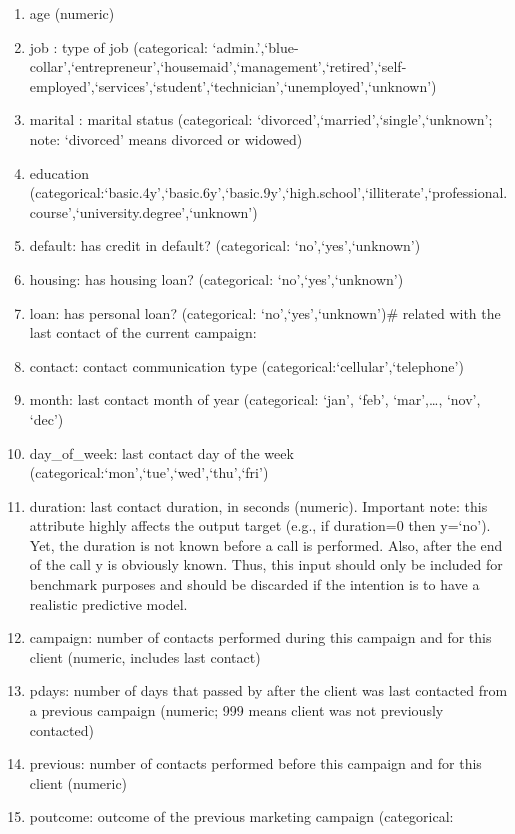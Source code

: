 \documentclass[]{article}
\providecommand{\tightlist}{%
  \setlength{\itemsep}{0pt}\setlength{\parskip}{0pt}}
\begin{document}
\begin{enumerate}
\def\labelenumi{\arabic{enumi}.}
\tightlist
\item
  age (numeric)
\item
  job : type of job (categorical:
  `admin.',`blue-collar',`entrepreneur',`housemaid',`management',`retired',`self-employed',`services',`student',`technician',`unemployed',`unknown')
\item
  marital : marital status (categorical:
  `divorced',`married',`single',`unknown'; note: `divorced' means
  divorced or widowed)
\item
  education
  (categorical:`basic.4y',`basic.6y',`basic.9y',`high.school',`illiterate',`professional.course',`university.degree',`unknown')
\item
  default: has credit in default? (categorical: `no',`yes',`unknown')
\item
  housing: has housing loan? (categorical: `no',`yes',`unknown')
\item
  loan: has personal loan? (categorical: `no',`yes',`unknown')\# related
  with the last contact of the current campaign:
\item
  contact: contact communication type
  (categorical:`cellular',`telephone')
\item
  month: last contact month of year (categorical: `jan', `feb',
  `mar',\ldots{}, `nov', `dec')
\item
  day\_of\_week: last contact day of the week
  (categorical:`mon',`tue',`wed',`thu',`fri')
\item
  duration: last contact duration, in seconds (numeric). Important note:
  this attribute highly affects the output target (e.g., if duration=0
  then y=`no'). Yet, the duration is not known before a call is
  performed. Also, after the end of the call y is obviously known. Thus,
  this input should only be included for benchmark purposes and should
  be discarded if the intention is to have a realistic predictive model.
\item
  campaign: number of contacts performed during this campaign and for
  this client (numeric, includes last contact)
\item
  pdays: number of days that passed by after the client was last
  contacted from a previous campaign (numeric; 999 means client was not
  previously contacted)
\item
  previous: number of contacts performed before this campaign and for
  this client (numeric)
\item
  poutcome: outcome of the previous marketing campaign (categorical:

\end{enumerate}
\end{document}

